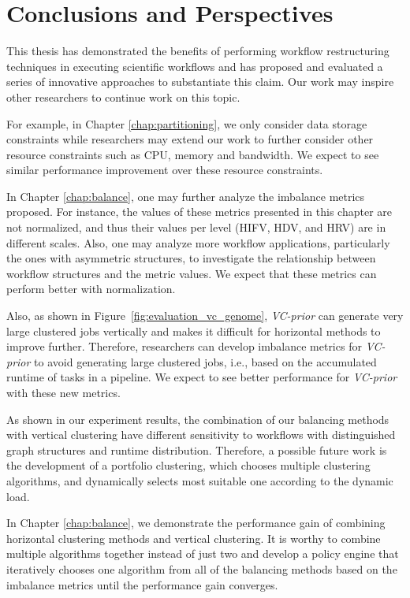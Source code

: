 \section{Conclusions and Perspectives}

This thesis has demonstrated the benefits of performing workflow restructuring techniques in executing scientific workflows and has proposed and evaluated a series of innovative approaches to substantiate this claim. Our work may inspire other researchers to continue work on this topic.  

For example, in Chapter \ref{chap:partitioning}, we only consider data storage constraints while researchers may extend our work to further consider other resource constraints such as CPU, memory and bandwidth. We expect to see similar performance improvement over these resource constraints. 

In Chapter \ref{chap:balance},  one may further analyze the imbalance metrics proposed. For instance, the values of these metrics presented in this chapter are not normalized, and thus their values per level (HIFV, HDV, and HRV) are in different scales. Also, one may analyze more workflow applications, particularly the ones with asymmetric structures, to investigate the relationship between workflow structures and the metric values. We expect that these metrics can perform better with normalization. 

Also, as shown in Figure~\ref{fig:evaluation_vc_genome}, \emph{VC-prior} can generate very large clustered jobs vertically and makes it difficult for horizontal methods to improve further. Therefore, researchers can develop imbalance metrics for \emph{VC-prior} to avoid generating large clustered jobs, i.e., based on the accumulated runtime of tasks in a pipeline. We expect to see better performance for \emph{VC-prior} with these new metrics. 


As shown in our experiment results, the combination of our balancing methods with vertical clustering have different sensitivity to workflows with distinguished graph structures and runtime distribution. Therefore, a possible future work is the development of a portfolio clustering, which chooses multiple clustering algorithms, and dynamically selects most suitable one according to the dynamic load.

In Chapter \ref{chap:balance}, we demonstrate the performance gain of combining horizontal clustering methods and vertical clustering. It is worthy to combine multiple algorithms together instead of just two and develop a policy engine that iteratively chooses one algorithm from all of the balancing methods based on the imbalance metrics until the performance gain converges. 

